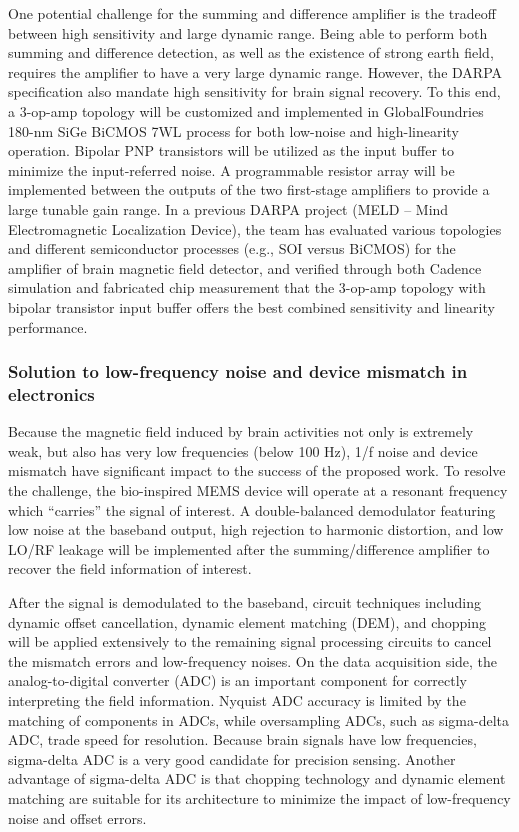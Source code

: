One potential challenge for the summing and difference amplifier is the tradeoff between high sensitivity and large dynamic range. Being able to perform both summing and difference detection, as well as the existence of strong earth field, requires the amplifier to have a very large dynamic range. However, the DARPA specification also mandate high sensitivity for brain signal recovery. To this end, a 3-op-amp topology will be customized and implemented in GlobalFoundries 180-nm SiGe BiCMOS 7WL process for both low-noise and high-linearity operation. Bipolar PNP transistors will be utilized as the input buffer to minimize the input-referred noise. A programmable resistor array will be implemented between the outputs of the two first-stage amplifiers to provide a large tunable gain range. In a previous DARPA project (MELD – Mind Electromagnetic Localization Device), the team has evaluated various topologies and different semiconductor processes (e.g., SOI versus BiCMOS) for the amplifier of brain magnetic field detector, and verified through both Cadence simulation and fabricated chip measurement that the 3-op-amp topology with bipolar transistor input buffer offers the best combined sensitivity and linearity performance.

\subsubsection{Solution to low-frequency noise and device mismatch in electronics}

Because the magnetic field induced by brain activities not only is extremely weak, but also has very low frequencies (below 100 Hz), 1/f noise and device mismatch have significant impact to the success of the proposed work. To resolve the challenge, the bio-inspired MEMS device will operate at a resonant frequency which “carries” the signal of interest. A double-balanced demodulator featuring low noise at the baseband output, high rejection to harmonic distortion, and low LO/RF leakage will be implemented after the summing/difference amplifier to recover the field information of interest. 

After the signal is demodulated to the baseband, circuit techniques including dynamic offset cancellation, dynamic element matching (DEM), and chopping will be applied extensively to the remaining signal processing circuits to cancel the mismatch errors and low-frequency noises. On the data acquisition side, the analog-to-digital converter (ADC) is an important component for correctly interpreting the field information. Nyquist ADC accuracy is limited by the matching of components in ADCs, while oversampling ADCs, such as sigma-delta ADC, trade speed for resolution. Because brain signals have low frequencies, sigma-delta ADC is a very good candidate for precision sensing. Another advantage of sigma-delta ADC is that chopping technology and dynamic element matching are suitable for its architecture to minimize the impact of low-frequency noise and offset errors.


